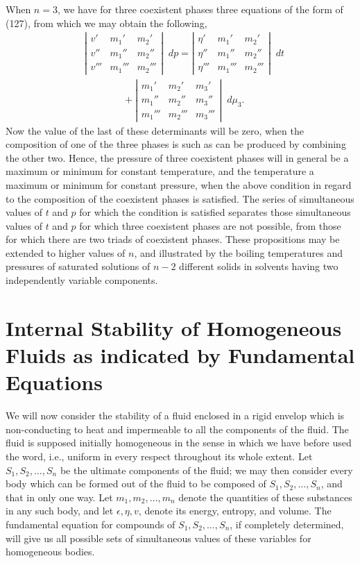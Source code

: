 \documentclass[11pt]{article}
\newcommand{\dd}{\mathop{}\!d}
\newcommand{\eps}{\epsilon}
\begin{document}
When \(n=3\), we have for three coexistent phases three equations of the form of (127), from which we may obtain the following,
\begin{equation}
\begin{aligned}
&\left|\begin{array}{ccc}
v'&m_1'&m_2'\\
v''&m_1''&m_2''\\
v'''&m_1'''&m_2'''
\end{array}\right|\dd p
=\left|\begin{array}{ccc}
\eta'&m_1'&m_2'\\
\eta''&m_1''&m_2''\\
\eta'''&m_1'''&m_2'''
\end{array}\right|\dd t \\
&\qquad\qquad +\left|\begin{array}{ccc}
m_1'&m_2'&m_3'\\
m_1''&m_2''&m_3''\\
m_1'''&m_2'''&m_3'''
\end{array}\right|\dd\mu_3.
\end{aligned}
\end{equation}
Now the value of the last of these determinants will be zero, when the composition of one of the three phases is such as can be produced by combining the other two. Hence, the pressure of three coexistent phases will in general be a maximum or minimum for constant temperature, and the temperature a maximum or minimum for constant pressure, when the above condition in regard to the composition of the coexistent phases is satisfied. The series of simultaneous values of \(t\) and \(p\) for which the condition is satisfied separates those simultaneous values of \(t\) and \(p\) for which three coexistent phases are not possible, from those for which there are two triads of coexistent phases. These propositions may be extended to higher values of \(n\), and illustrated by the boiling temperatures and pressures of saturated solutions of \(n-2\) different solids in solvents having two independently variable components.

\section*{Internal Stability of Homogeneous Fluids as indicated by Fundamental Equations}

We will now consider the stability of a fluid enclosed in a rigid envelop which is non-conducting to heat and impermeable to all the components of the fluid. The fluid is supposed initially homogeneous in the sense in which we have before used the word, i.e., uniform in every respect throughout its whole extent. Let \(S_1,S_2,\ldots,S_n\) be the ultimate components of the fluid; we may then consider every body which can be formed out of the fluid to be composed of \(S_1,S_2,\ldots,S_n\), and that in only one way. Let \(m_1,m_2,\ldots,m_n\) denote the quantities of these substances in any such body, and let \(\eps,\eta,v\), denote its energy, entropy, and volume. The fundamental equation for compounds of \(S_1,S_2,\ldots,S_n\), if completely determined, will give us all possible sets of simultaneous values of these variables for homogeneous bodies.
\end{document}

